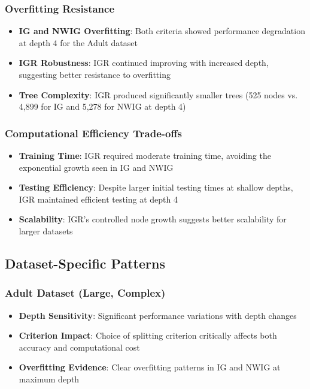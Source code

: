 \documentclass{article}
\begin{document}
\subsubsection{Overfitting Resistance}
\begin{itemize}
    \item \textbf{IG and NWIG Overfitting}: Both criteria showed performance degradation at depth 4 for the Adult dataset
    \item \textbf{IGR Robustness}: IGR continued improving with increased depth, suggesting better resistance to overfitting
    \item \textbf{Tree Complexity}: IGR produced significantly smaller trees (525 nodes vs. 4,899 for IG and 5,278 for NWIG at depth 4)
\end{itemize}

\subsubsection{Computational Efficiency Trade-offs}
\begin{itemize}
    \item \textbf{Training Time}: IGR required moderate training time, avoiding the exponential growth seen in IG and NWIG
    \item \textbf{Testing Efficiency}: Despite larger initial testing times at shallow depths, IGR maintained efficient testing at depth 4
    \item \textbf{Scalability}: IGR's controlled node growth suggests better scalability for larger datasets
\end{itemize}

\subsection{Dataset-Specific Patterns}

\subsubsection{Adult Dataset (Large, Complex)}
\begin{itemize}
    \item \textbf{Depth Sensitivity}: Significant performance variations with depth changes
    \item \textbf{Criterion Impact}: Choice of splitting criterion critically affects both accuracy and computational cost
    \item \textbf{Overfitting Evidence}: Clear overfitting patterns in IG and NWIG at maximum depth
\end{itemize}
\end{document}
